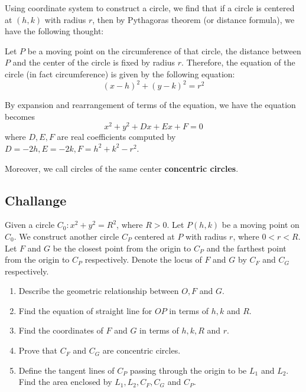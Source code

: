 \documentclass[12pt]{article}
\begin{document}
    Using coordinate system to construct a circle, we find that if a circle is centered at $(h,k)$ with radius $r$, then by Pythagoras theorem (or distance formula), we have the following thought:

    Let $P$ be a moving point on the circumference of that circle, the distance between $P$ and the center of the circle is fixed by radius $r$. Therefore, the equation of the circle (in fact circumference) is given by the following equation: $$(x-h)^2+(y-k)^2=r^2$$

    By expansion and rearrangement of terms of the equation, we have the equation becomes $$x^2+y^2+Dx+Ex+F=0$$ where $D,E,F$ are real coefficients computed by $D=-2h, E=-2k, F=h^2+k^2-r^2$.

    Moreover, we call circles of the same center \textbf{concentric circles}.

    \subsection*{Challange}

    Given a circle $C_0:x^2+y^2=R^2$, where $R>0$. Let $P(h,k)$ be a moving point on $C_0$. We construct another circle $C_P$ centered at $P$ with radius $r$, where $0<r<R$. Let $F$ and $G$ be the closest point from the origin to $C_P$ and the farthest point from the origin to $C_P$ respectively. Denote the locus of $F$ and $G$ by $C_F$ and $C_G$ respectively.

    \begin{enumerate}
        \item Describe the geometric relationship between $O,F$ and $G$.
        \item Find the equation of straight line for $OP$ in terms of $h,k$ and $R$.
        \item Find the coordinates of $F$ and $G$ in terms of $h,k,R$ and $r$.
        \item Prove that $C_F$ and $C_G$ are concentric circles.
        \item Define the tangent lines of $C_P$ passing through the origin to be $L_1$ and $L_2$. Find the area enclosed by $L_1,L_2,C_F,C_G$ and $C_P$.
    \end{enumerate}
\end{document}
